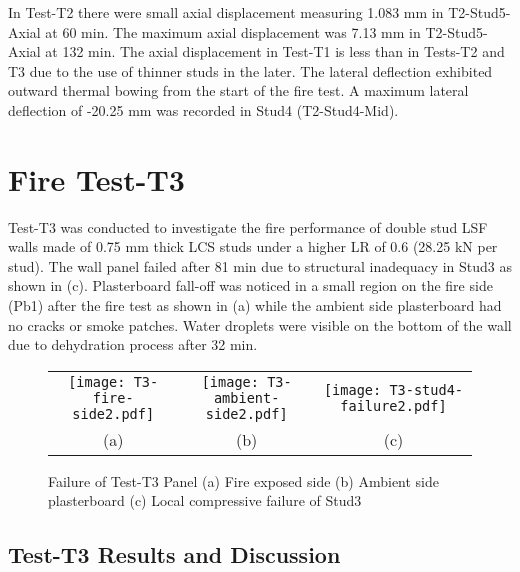 In Test-T2 there were small axial displacement measuring 1.083 mm in T2-Stud5-Axial at 60 min. The maximum axial displacement was 7.13 mm in T2-Stud5-Axial at 132 min. The axial displacement in Test-T1 is less than in Tests-T2 and T3 due to the use of thinner studs in the later. The lateral deflection exhibited outward thermal bowing from the start of the fire test. A maximum lateral deflection of -20.25 mm was recorded in Stud4 (T2-Stud4-Mid). 

\section{Fire Test-T3}

Test-T3 was conducted to investigate the fire performance of double stud LSF walls made of 0.75 mm thick LCS studs under a higher LR of 0.6 (28.25 kN per stud). The wall panel failed after 81 min due to structural inadequacy in Stud3 as shown in  (c). Plasterboard fall-off was noticed in a small region on the fire side (Pb1) after the fire test as shown in  (a) while the ambient side plasterboard had no cracks or smoke patches. Water droplets were visible on the bottom of the wall due to dehydration process after 32 min.
\begin{figure}[!htbp]
	\centering
		\begin{tabular}{ccc}
			\texttt{[image: T3-fire-side2.pdf]} & 
			\texttt{[image: T3-ambient-side2.pdf]} &
			\texttt{[image: T3-stud4-failure2.pdf]} \\	 
			(a) & (b) & (c)  \\ 
		\end{tabular} 
		\caption{Failure of Test-T3 Panel (a) Fire exposed side (b) Ambient side plasterboard (c) Local compressive failure of Stud3}
		\label{fig:T3-failure}
\end{figure}

\subsection{Test-T3 Results and Discussion}

